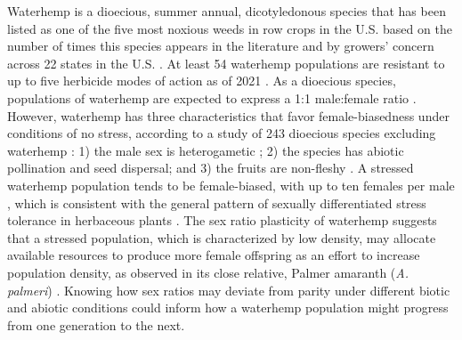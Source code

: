 \documentclass[utf8]{frontiersSCNS}
\begin{document}
Waterhemp is a dioecious, summer annual, dicotyledonous species that has been listed as one of the five most noxious weeds in row crops in the U.S. based on the number of times this species appears in the literature \citep{johnsonInfluenceGlyphosateresistantCropping2009} and by growers' concern across 22 states in the U.S. \citep{princeBenchmarkStudyIV2012}. At least 54 waterhemp populations are resistant to up to five herbicide modes of action as of 2021 \citep{heapHerbicideResistantTall2021}. As a dioecious species, populations of waterhemp are expected to express a 1:1 male:female ratio \citep{grantCytogeneticStudiesAmaranthus1959, costeaBiologyInvasiveAlien2005, heneghanGrowthDevelopmentFive2017}. However, waterhemp has three characteristics that favor female-biasedness under conditions of no stress, according to a study of 243 dioecious species excluding waterhemp \citep{fieldComparativeAnalysesSexratio2013}: 1) the male sex is heterogametic \citep{montgomeryMaleSpecificChromosomal2021}; 2) the species has abiotic pollination and seed dispersal; and 3) the fruits are non-fleshy \citep{costeaBiologyInvasiveAlien2005}. A stressed waterhemp population tends to be female-biased, with up to ten females per male \citep{prattAmaranthusRudisTuberculatus2001}, which is consistent with the general pattern of sexually differentiated stress tolerance in herbaceous plants \citep[38 species, excluding waterhemp,][]{juvanySexrelatedDifferencesStress2015}. The sex ratio plasticity of waterhemp suggests that a stressed population, which is characterized by low density, may allocate available resources to produce more female offspring as an effort to increase population density, as observed in its close relative, Palmer amaranth (\emph{A. palmeri}) \citep{korresPalmerAmaranthAmaranthus2017, mesgaranSexLabilityDimorphism2019}. Knowing how sex ratios may deviate from parity under different biotic and abiotic conditions could inform how a waterhemp population might progress from one generation to the next.
\end{document}
